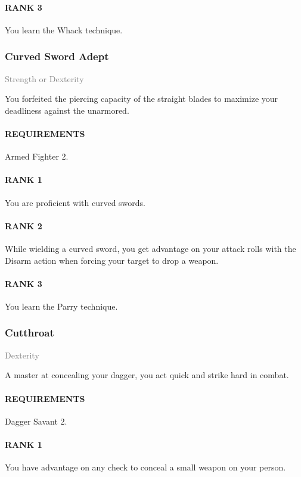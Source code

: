 \paragraph{RANK 3} You learn the Whack technique.

\subsubsection{Curved Sword Adept} \label{feat::curvedswordadept}
\small{\textcolor{gray}{Strength or Dexterity}}

\normalsize
You forfeited the piercing capacity of the straight blades to maximize your deadliness against the unarmored.
\paragraph{REQUIREMENTS} Armed Fighter 2.
\paragraph{RANK 1} You are proficient with curved swords.
\paragraph{RANK 2} While wielding a curved sword, you get advantage on your attack rolls with the Disarm action when forcing your target to drop a weapon.
\paragraph{RANK 3} You learn the Parry technique.

\subsubsection{Cutthroat} \label{feat::cutthroat}
\small{\textcolor{gray}{Dexterity}}

\normalsize
A master at concealing your dagger, you act quick and strike hard in combat.
\paragraph{REQUIREMENTS} Dagger Savant 2.
\paragraph{RANK 1} You have advantage on any check to conceal a small weapon on your person.
